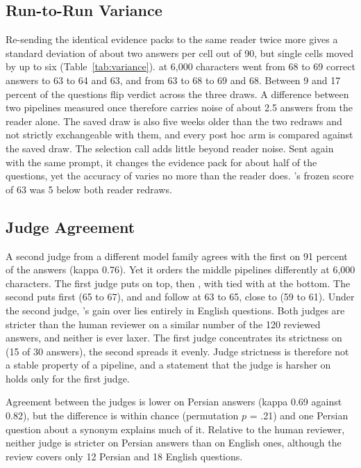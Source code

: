 \subsection{Run-to-Run Variance}
Re-sending the identical evidence packs to the same reader twice more gives a standard deviation of about two answers per cell out of 90, but single cells moved by up to six (Table~\ref{tab:variance}). \lexb{} at 6,000 characters went from 68 to 69 correct answers to 63 to 64 and 63, and \setr{} from 63 to 68 to 69 and 68. Between 9 and 17 percent of the questions flip verdict across the three draws. A difference between two pipelines measured once therefore carries noise of about 2.5 answers from the reader alone. The saved draw is also five weeks older than the two redraws and not strictly exchangeable with them, and every post hoc arm is compared against the saved draw. The selection call adds little beyond reader noise. Sent again with the same prompt, it changes the evidence pack for about half of the questions, yet the accuracy of \lexb{} varies no more than the reader does. \setr's frozen score of 63 was 5 below both reader redraws.

\subsection{Judge Agreement}
A second judge from a different model family agrees with the first on 91 percent of the answers (kappa 0.76). Yet it orders the middle pipelines differently at 6,000 characters. The first judge puts \hr{} on top, then \lexb, with \setr{} tied with \hybrid{} at the bottom. The second puts \lexb{} first (65 to 67), and \hr{} and \setr{} follow at 63 to 65, close to \hybrid{} (59 to 61). Under the second judge, \lexb's gain over \hybrid{} lies entirely in English questions. Both judges are stricter than the human reviewer on a similar number of the 120 reviewed answers, and neither is ever laxer. The first judge concentrates its strictness on \setr{} (15 of 30 answers), the second spreads it evenly. Judge strictness is therefore not a stable property of a pipeline, and a statement that the judge is harsher on \setr{} holds only for the first judge.

Agreement between the judges is lower on Persian answers (kappa 0.69 against 0.82), but the difference is within chance (permutation $p$ = .21) and one Persian question about a synonym explains much of it. Relative to the human reviewer, neither judge is stricter on Persian answers than on English ones, although the review covers only 12 Persian and 18 English questions.

